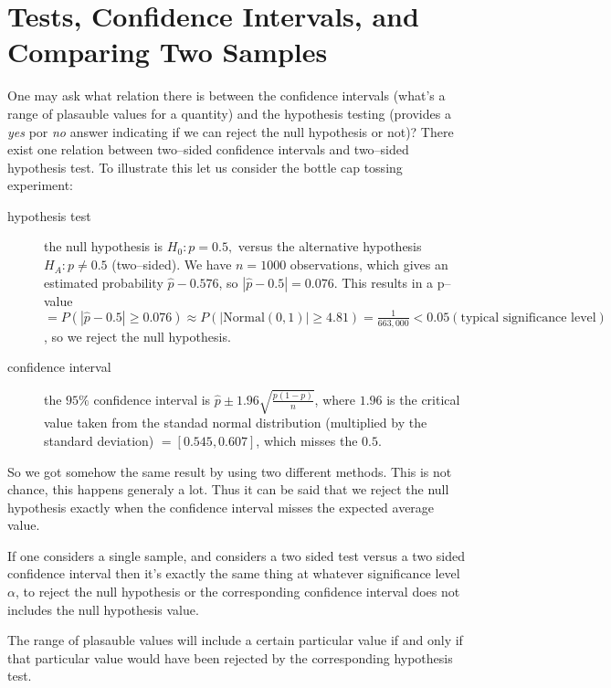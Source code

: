 \chapter*{Tests, Confidence Intervals, and Comparing Two Samples}

\setcounter{section}{0}
\renewcommand*{\theHsection}{ch6.\the\value{section}}

One may ask what relation there is between the confidence intervals (what's a
range of plasauble values for a quantity) and the hypothesis testing (provides a
\emph{yes} por \emph{no} answer indicating if we can reject the null hypothesis
or not)? There exist one relation between two--sided confidence intervals and
two--sided hypothesis test. To illustrate this let us consider the bottle cap
tossing experiment: 

\begin{description}
  \item[hypothesis test] the null hypothesis is $H_0: p=0.5,$ versus the
  alternative hypothesis $H_A: p \neq 0.5$ (two--sided). We have $n=1000$
  observations, which gives an estimated probability $\hat{p}-0.576$, so
  $|\hat{p}-0.5|=0.076$. This results in a p--value $=P(|\hat{p}-0.5| \geq
  0.076) \approx P(|\mbox{Normal}(0,1)| \geq 4.81) = \frac{1}{663,000} <
  0.05 (\mbox{typical significance level})$, so we reject the null hypothesis.
  
  \item[confidence interval] the $95\%$ confidence interval is $\hat{p} \pm
  1.96 \sqrt{\frac{p(1-p)}{n}}$, where $1.96$ is the critical value
  taken from the standad normal distribution (multiplied by the standard
  deviation) $= [0.545, 0.607]$, which misses the $0.5$.
\end{description}

So we got somehow the same result by using two different methods. This is not
chance, this happens generaly a lot. Thus it can be said that we reject the null
hypothesis exactly when the confidence interval misses the expected average
value.

If one considers a single sample, and considers a two sided test versus a two
sided confidence interval then it's exactly the same thing at whatever
significance level $\alpha$, to reject the null hypothesis or the corresponding
confidence interval does not includes the null hypothesis value. 

The range of plasauble values  will include a certain particular value if and
only if that particular value would have been rejected by the corresponding
hypothesis test.


